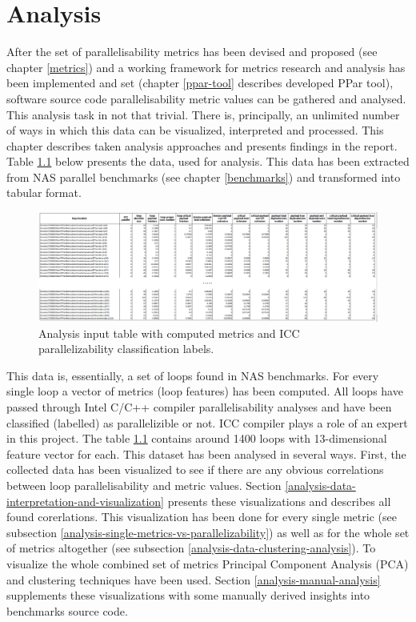 \chapter{Analysis}
\label{analysis}
\null\qquad After the set of parallelisability metrics has been devised and proposed (see chapter \ref{metrics}) and a working framework for metrics research and analysis has been implemented and set (chapter \ref{ppar-tool} describes developed PPar tool), software source code parallelisability metric values can be gathered and analysed. This analysis task in not that trivial. There is, principally, an unlimited number of ways in which this data can be visualized, interpreted and processed. This chapter describes taken analysis approaches and presents findings in the report.\newline
\null\qquad Table \ref{analysis-data-table} below presents the data, used for analysis. This data has been extracted from NAS parallel benchmarks (see chapter \ref{benchmarks}) and transformed into tabular format.
\begin{figure}[htb]
\centering
\includegraphics[width=\linewidth]{figs/metrics-table.png}
\caption{Analysis input table with computed metrics and ICC parallelizability classification labels.}
\label{analysis-data-table}
\end{figure} \newline
\null\qquad This data is, essentially, a set of loops found in NAS benchmarks. For every single loop a vector of metrics (loop features) has been computed. All loops have passed through Intel C/C++ compiler parallelisability analyses and have been classified (labelled) as parallelizible or not. ICC compiler plays a role of an expert in this project. The table \ref{analysis-data-table} contains around 1400 loops with 13-dimensional feature vector for each.\newline 
\null\qquad This dataset has been analysed in several ways. First, the collected data has been visualized to see if there are any obvious correlations between loop parallelisability and metric values. Section \ref{analysis-data-interpretation-and-visualization} presents these visualizations and describes all found corerlations. This visualization has been done for every single metric (see subsection \ref{analysis-single-metrics-vs-parallelizability}) as well as for the whole set of metrics altogether (see subsection \ref{analysis-data-clustering-analysis}). To visualize the whole combined set of metrics Principal Component Analysis (PCA) and clustering techniques have been used. Section \ref{analysis-manual-analysis} supplements these visualizations with some manually derived insights into benchmarks source code. \newline 

